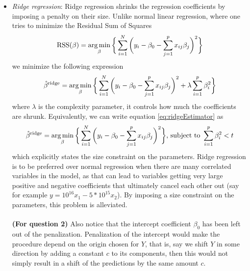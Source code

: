 \begin{itemize}

    \item \textit{Ridge regression}: Ridge regression shrinks the regression coefficients by imposing a penalty on their size. Unlike normal linear regression, where one tries to minimize the Residual Sum of Squares \begin{equation*}
        \text{RSS}(\beta) = \operatorname*{arg\,min}_{\beta}\bigg\{\sum_{i=1}^N \bigg( y_i - \beta_0 - \sum_{j=1}^p x_{ij}\beta_j\bigg)^2\bigg\}
    \end{equation*}
    we minimize the following expression \begin{equation}\label{eq:ridgeEstimator}
        \hat{\beta}{}^{\text{ridge}} = \operatorname*{arg\,min}_{\beta}\bigg\{\sum_{i=1}^N \bigg( y_i - \beta_0 - \sum_{j=1}^p x_{ij}\beta_j\bigg)^2 + \lambda \sum_{i=1}^p \beta_i^2\bigg\}
    \end{equation}
    where $\lambda$ is the complexity parameter, it controls how much the coefficients are shrunk. Equivalently, we can write equation \eqref{eq:ridgeEstimator} as \begin{equation}\label{eq:ridgeEstimatorEquivalent}
    \begin{aligned}
        \hat{\beta}{}^{\text{ridge}} = \argmin_{\beta}\bigg\{\sum_{i=1}^N \bigg(y_i - \beta_0 - \sum_{j=1}^p x_{ij}\beta_j\bigg)^2\bigg\} \newline \text{, subject to } \sum_{i=1}^p \beta_i^2 < t
    \end{aligned}
    \end{equation}
    which explicitly states the size constraint on the parameters. Ridge regression is to be preferred over normal regression when there are many correlated variables in the model, as that can lead to variables getting very large positive and negative coefficients that ultimately cancel each other out (say for example $y = 10^{16}x_1 - 5*10^{15}x_2$). By imposing a size constraint on the parameters, this problem is alleviated.\\
    \\
    \textbf{(For question 2)} Also notice that the intercept coefficient $\beta_0$ has been left out of the penalization. Penalization of the intercept would make the procedure depend on the origin chosen for $Y$, that is, say we shift $Y$ in some direction by adding a constant $c$ to its components, then this would not simply result in a shift of the predictions by the same amount $c$.\\
    \\

\end{itemize}
